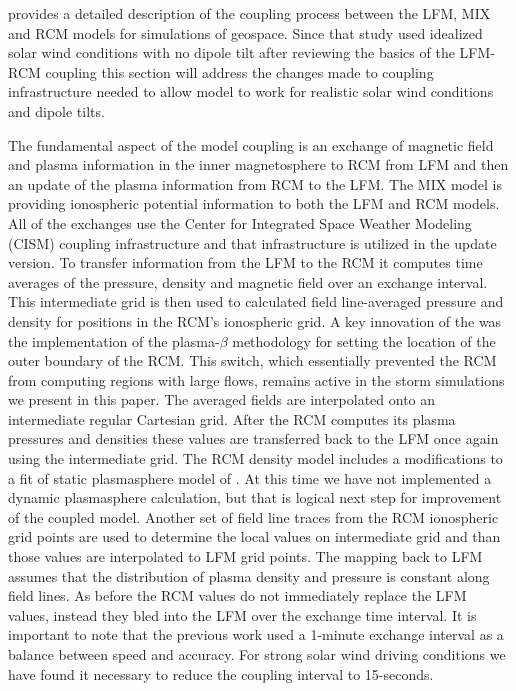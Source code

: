 \documentclass[draft,jgrga]{agutex}
\begin{document}
\begin{article}
\cite{Pembroke:2012gc} provides a detailed description of the coupling process between the LFM, MIX and RCM models for simulations of geospace.  Since that study used idealized solar wind conditions with no dipole tilt after reviewing the basics of the LFM-RCM coupling this section will address the changes made to coupling infrastructure needed to allow model to work for realistic solar wind conditions and dipole tilts.  

The fundamental aspect of the model coupling is an exchange of magnetic field and plasma information in the inner magnetosphere to RCM from LFM and then an update of the plasma information from RCM to the LFM.  The MIX model is providing ionospheric potential information to both the LFM and RCM models.  All of the exchanges use the Center for Integrated Space Weather Modeling (CISM) \cite{2004JASTP..66.1469G} coupling infrastructure  and that infrastructure is utilized in the update version.  To transfer information from the LFM to the RCM it computes time averages of the pressure, density and magnetic field over an exchange interval.  This intermediate grid is then used to calculated field line-averaged pressure and density for positions in the RCM's ionospheric grid.  A key innovation of the \cite{Pembroke:2012gc} was the implementation of the plasma-$\beta$ methodology for setting the location of the outer boundary of the RCM.  This switch, which essentially prevented the RCM from computing regions with large flows, remains active in the storm simulations we present in this paper.  The averaged fields are interpolated onto an intermediate regular Cartesian grid. After the RCM computes its plasma pressures and densities these values are transferred back to the LFM once again using the intermediate grid.  The RCM density model includes a modifications to a fit of static plasmasphere model of \cite{Gallagher:2000p2797}.  At this time we have not implemented a dynamic plasmasphere calculation, but that is logical next step for improvement of the coupled model.  Another set of field line traces from the RCM ionospheric grid points are used to determine the local values on intermediate grid and than those values are interpolated to LFM grid points.  The mapping back to LFM assumes that the distribution of plasma density and pressure  is constant along field lines. As before the RCM values do not immediately replace the LFM values, instead they bled into the LFM over the exchange time interval.  It is important to note that the previous work used a 1-minute exchange interval as a  balance between speed and accuracy.  For strong solar wind driving conditions we have found it necessary to reduce the coupling interval to 15-seconds. 


\end{article}
\end{document}
